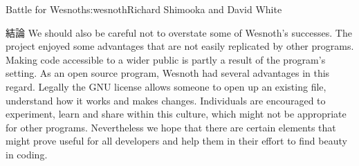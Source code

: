 \begin{aosachapter}{Battle for Wesnoth}{s:wesnoth}{Richard Shimooka and David White}
\begin{aosasect1}{結論}
We should also be careful not to overstate some of Wesnoth's
successes.  The project enjoyed some advantages that are not easily
replicated by other programs. Making code accessible to a wider public
is partly a result of the program's setting. As an open source
program, Wesnoth had several advantages in this regard. Legally the
GNU license allows someone to open up an existing file, understand how
it works and makes changes.  Individuals are encouraged to experiment,
learn and share within this culture, which might not be appropriate
for other programs. Nevertheless we hope that there are certain
elements that might prove useful for all developers and help them in
their effort to find beauty in coding.

\end{aosasect1}

\end{aosachapter}
